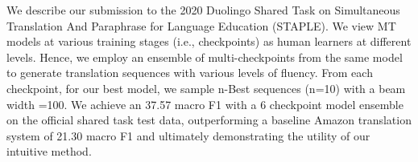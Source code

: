 We describe our submission to the 2020 Duolingo Shared Task on Simultaneous Translation And Paraphrase for Language Education (STAPLE). We view MT models at various training stages (i.e., checkpoints) as human learners at different levels. Hence, we employ an ensemble of multi-checkpoints from the same model to generate translation sequences with various levels of fluency. From each checkpoint, for our best model, we sample n-Best sequences (n=10) with a beam width =100. We achieve an 37.57 macro  F1 with a 6 checkpoint model ensemble on the official shared task test data, outperforming a baseline Amazon translation system of 21.30 macro F1 and ultimately demonstrating the utility of our intuitive method.
